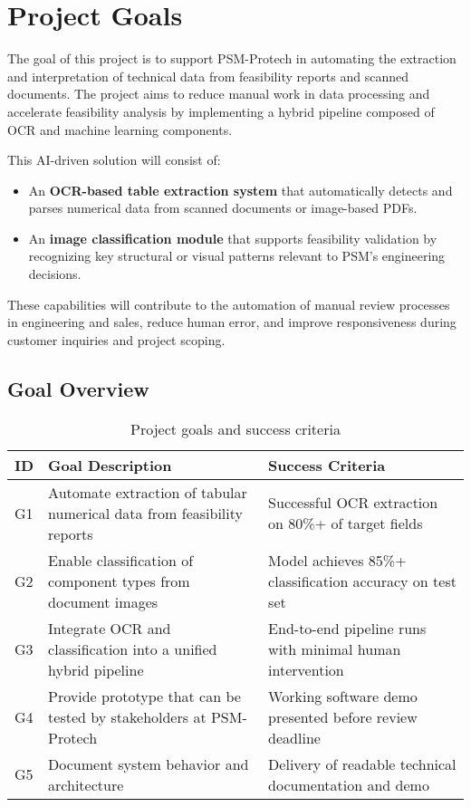 \section{Project Goals}

The goal of this project is to support PSM-Protech in automating the extraction and interpretation of technical data from feasibility reports and scanned documents. The project aims to reduce manual work in data processing and accelerate feasibility analysis by implementing a hybrid pipeline composed of OCR and machine learning components.

This AI-driven solution will consist of:
\begin{itemize}
    \item An \textbf{OCR-based table extraction system} that automatically detects and parses numerical data from scanned documents or image-based PDFs.
    \item An \textbf{image classification module} that supports feasibility validation by recognizing key structural or visual patterns relevant to PSM’s engineering decisions.
\end{itemize}

These capabilities will contribute to the automation of manual review processes in engineering and sales, reduce human error, and improve responsiveness during customer inquiries and project scoping.

\subsection*{Goal Overview}

\begin{table}[ht]
\centering
\begin{tabular}{|p{1cm}|p{8cm}|p{4cm}|}
\hline
\textbf{ID} & \textbf{Goal Description} & \textbf{Success Criteria} \\
\hline
G1 & Automate extraction of tabular numerical data from feasibility reports & Successful OCR extraction on 80\%+ of target fields \\
\hline
G2 & Enable classification of component types from document images & Model achieves 85\%+ classification accuracy on test set \\
\hline
G3 & Integrate OCR and classification into a unified hybrid pipeline & End-to-end pipeline runs with minimal human intervention \\
\hline
G4 & Provide prototype that can be tested by stakeholders at PSM-Protech & Working software demo presented before review deadline \\
\hline
G5 & Document system behavior and architecture & Delivery of readable technical documentation and demo \\
\hline
\end{tabular}
\caption{Project goals and success criteria}
\label{tab:project_goals}
\end{table}

